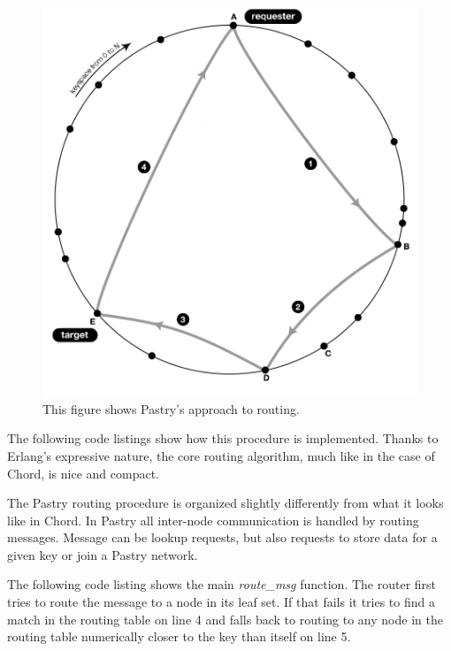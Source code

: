 \begin{figure}[!htb]
\begin{center}
	\includegraphics[width=0.9\linewidth]{illustrations/PastryRoutingSuccess.png}
  \caption{This figure shows Pastry's approach to routing.}
  \label{figRoutingPastry}
\end{center}
\end{figure}

The following code listings show how this procedure is implemented. Thanks to Erlang's expressive nature, the core routing algorithm, much like in the case of Chord, is nice and compact.

The Pastry routing procedure is organized slightly differently from what it looks like in Chord. In Pastry all inter-node communication is handled by routing messages.
Message can be lookup requests, but also requests to store data for a given key or join a Pastry network.

The following code listing shows the main \emph{route\_msg} function. 
The router first tries to route the message to a node in its leaf set. If that fails it tries to find a match in the routing table on line 4 and falls back to routing to any node in the routing table numerically closer to the key than itself on line 5.



